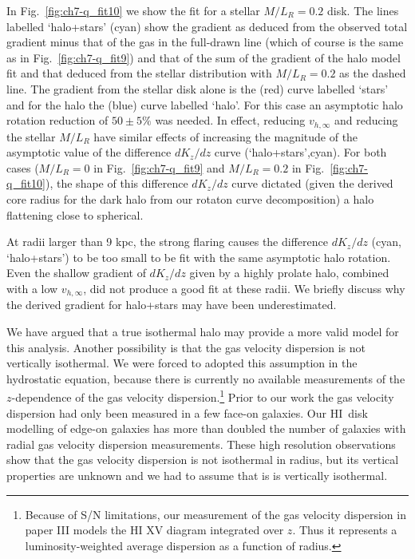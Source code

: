 \documentclass[traditabstract]{aa} %
\newcommand\HI{H{\small I}}
\begin{document}
In  Fig.~\ref{fig:ch7-q_fit10} we show the fit for a stellar $M/L_R=0.2$ disk. 
The lines labelled `halo+stars' (cyan) show the gradient as deduced from the
observed total gradient minus that of the gas in the full-drawn line (which of
course is the same as in Fig.~\ref{fig:ch7-q_fit9}) and that of 
the sum of the gradient of the halo model
fit and that deduced from the stellar distribution with $M/L_R=0.2$ as
the dashed line. The gradient from the stellar disk alone is the (red) curve
labelled `stars' and for the halo the (blue) curve labelled `halo'. 
For this case an asymptotic halo rotation reduction of $50\pm5\%$ was needed. 
In effect, reducing $v_{h,\infty}$
and reducing the stellar $M/L_R$ have similar effects of increasing the
magnitude of the asymptotic value of the difference $dK_z/dz$ curve
(`halo+stars',cyan). For
both cases ($M/L_R=0$ in  Fig.~\ref{fig:ch7-q_fit9} and $M/L_R=0.2$ in
Fig.~\ref{fig:ch7-q_fit10}), the shape of this difference $dK_z/dz$ curve 
dictated (given the derived core radius for the dark halo from our
rotaton curve decomposition) a halo flattening close to spherical.


At radii larger than 9 kpc, the strong flaring causes the difference
$dK_z/dz$ (cyan, `halo+stars') to be too small to be fit with the 
same asymptotic halo rotation. 
Even the shallow gradient of $dK_z/dz$ given by a highly
prolate halo, combined with a low $v_{h,\infty}$, did not produce a
good fit at these radii. We briefly discuss why the derived gradient for
halo+stars may have been underestimated.

We have argued that a true isothermal halo may provide a more valid
model for this analysis. Another possibility is that the gas velocity
dispersion is not vertically isothermal. We were forced to adopted this
assumption in the hydrostatic equation, because there is currently no available
measurements of the $z$-dependence of the gas velocity 
dispersion.\footnote{Because of S/N limitations, our measurement of the 
gas velocity dispersion in paper III models the H{\scriptsize I}
XV diagram integrated over $z$. Thus it represents a luminosity-weighted
average dispersion as a function of radius.} Prior to our work the
gas velocity dispersion had only been measured in a few face-on
galaxies. Our \HI\ disk modelling of edge-on galaxies has more than
doubled the number of galaxies with radial gas velocity dispersion
measurements. These high resolution observations show that the gas
velocity dispersion is not isothermal in radius, but its vertical
properties are unknown and we had to assume that is is vertically
isothermal.
\end{document}

